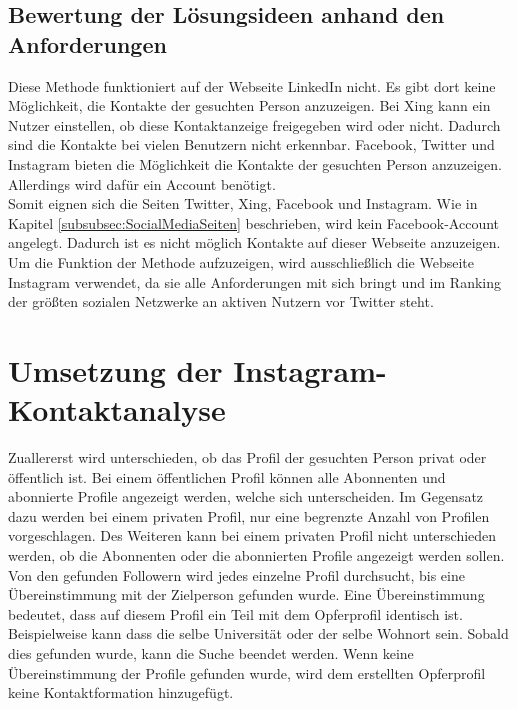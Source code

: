 	\subsection{Bewertung der Lösungsideen anhand den Anforderungen}
	Diese Methode funktioniert auf der Webseite LinkedIn nicht. Es gibt dort keine Möglichkeit, die Kontakte der gesuchten Person anzuzeigen. Bei Xing kann ein Nutzer einstellen, ob diese Kontaktanzeige freigegeben wird oder nicht. Dadurch sind die Kontakte bei vielen Benutzern nicht erkennbar. Facebook, Twitter und Instagram bieten die Möglichkeit die Kontakte der gesuchten Person anzuzeigen. Allerdings wird dafür ein Account benötigt.\\
	Somit eignen sich die Seiten Twitter, Xing, Facebook und Instagram. Wie in Kapitel \ref{subsubsec:SocialMediaSeiten} beschrieben, wird kein Facebook-Account angelegt. Dadurch ist es nicht möglich Kontakte auf dieser Webseite anzuzeigen. Um die Funktion der Methode aufzuzeigen, wird ausschließlich die Webseite Instagram verwendet, da sie alle Anforderungen mit sich bringt und im Ranking der größten sozialen Netzwerke an aktiven Nutzern vor Twitter steht. \cite{RankingSozialeNetzwerke}

\section{Umsetzung der Instagram-Kontaktanalyse} 
Zuallererst wird unterschieden, ob das Profil der gesuchten Person privat oder öffentlich ist. Bei einem öffentlichen Profil können alle Abonnenten und abonnierte Profile angezeigt werden, welche sich unterscheiden. Im Gegensatz dazu werden bei einem privaten Profil, nur eine begrenzte Anzahl von Profilen vorgeschlagen. Des Weiteren kann bei einem privaten Profil nicht unterschieden werden, ob die Abonnenten oder die abonnierten Profile angezeigt werden sollen.\\
Von den gefunden Followern wird jedes einzelne Profil durchsucht, bis eine Übereinstimmung mit der Zielperson gefunden wurde. Eine Übereinstimmung bedeutet, dass auf diesem Profil ein Teil mit dem Opferprofil identisch ist. Beispielweise kann dass die selbe Universität oder der selbe Wohnort sein. Sobald dies gefunden wurde, kann die Suche beendet werden. Wenn keine Übereinstimmung der Profile gefunden wurde, wird dem erstellten Opferprofil keine Kontaktformation hinzugefügt.

